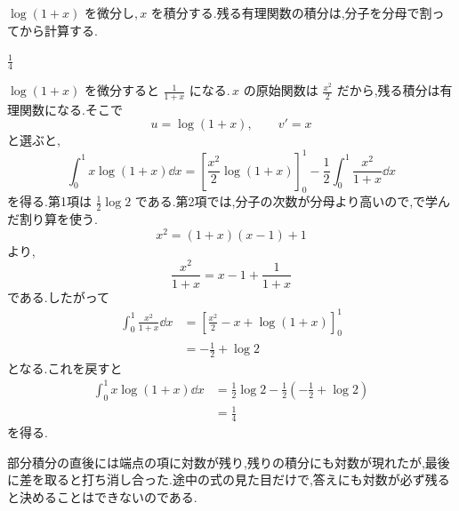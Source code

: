$\log(1+x)$ を微分し,\,$x$ を積分する.残る有理関数の積分は,分子を分母で割ってから計算する.

$\frac14$

$\log(1+x)$ を微分すると $\frac1{1+x}$ になる.\,$x$ の原始関数は $\frac{x^2}{2}$ だから,残る積分は有理関数になる.そこで
\[
 u=\log(1+x),\qquad v'=x
\]
と選ぶと,
\[
 \int_0^1x\log(1+x)\dd x
 =\left[\frac{x^2}{2}\log(1+x)\right]_0^1
  -\frac12\int_0^1\frac{x^2}{1+x}\dd x
\]
を得る.第1項は $\frac12\log2$ である.第2項では,分子の次数が分母より高いので,で学んだ割り算を使う.
\[
 x^2=(1+x)(x-1)+1
\]
より,
\[
 \frac{x^2}{1+x}=x-1+\frac1{1+x}
\]
である.したがって
\[
\begin{aligned}
 \int_0^1\frac{x^2}{1+x}\dd x
 &=\left[\frac{x^2}{2}-x+\log(1+x)\right]_0^1\\
 &=-\frac12+\log2
\end{aligned}
\]
となる.これを戻すと
\[
\begin{aligned}
 \int_0^1x\log(1+x)\dd x
 &=\frac12\log2-\frac12\left(-\frac12+\log2\right)\\
 &=\frac14
\end{aligned}
\]
を得る.

部分積分の直後には端点の項に対数が残り,残りの積分にも対数が現れたが,最後に差を取ると打ち消し合った.途中の式の見た目だけで,答えにも対数が必ず残ると決めることはできないのである.
